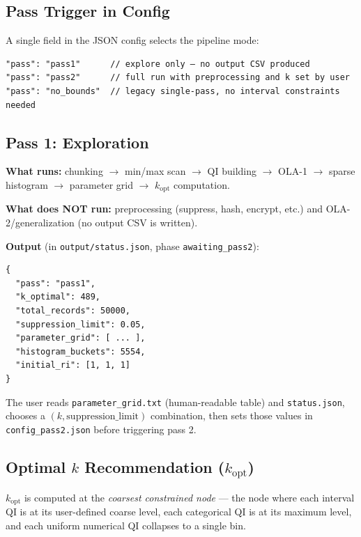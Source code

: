 \documentclass[12pt,a4paper]{article}
\begin{document}
\subsection{Pass Trigger in Config}

A single field in the JSON config selects the pipeline mode:

\begin{lstlisting}[language={}]
"pass": "pass1"      // explore only — no output CSV produced
"pass": "pass2"      // full run with preprocessing and k set by user
"pass": "no_bounds"  // legacy single-pass, no interval constraints needed
\end{lstlisting}

\subsection{Pass 1: Exploration}

\textbf{What runs:} chunking $\to$ min/max scan $\to$ QI building $\to$
OLA-1 $\to$ sparse histogram $\to$ parameter grid $\to$ $k_{\text{opt}}$ computation.

\textbf{What does NOT run:} preprocessing (suppress, hash, encrypt, etc.) and
OLA-2/generalization (no output CSV is written).

\textbf{Output} (in \texttt{output/status.json}, phase \texttt{awaiting\_pass2}):

\begin{lstlisting}[language={}]
{
  "pass": "pass1",
  "k_optimal": 489,
  "total_records": 50000,
  "suppression_limit": 0.05,
  "parameter_grid": [ ... ],
  "histogram_buckets": 5554,
  "initial_ri": [1, 1, 1]
}
\end{lstlisting}

The user reads \texttt{parameter\_grid.txt} (human-readable table) and
\texttt{status.json}, chooses a $(k, \text{suppression\_limit})$ combination,
then sets those values in \texttt{config\_pass2.json} before triggering pass 2.

\subsection{Optimal \texorpdfstring{$k$}{k} Recommendation (\texorpdfstring{$k_{\text{opt}}$}{k\_opt})}

$k_{\text{opt}}$ is computed at the \emph{coarsest constrained node} — the
node where each interval QI is at its user-defined coarse level, each
categorical QI is at its maximum level, and each uniform numerical QI collapses
to a single bin.
\end{document}
